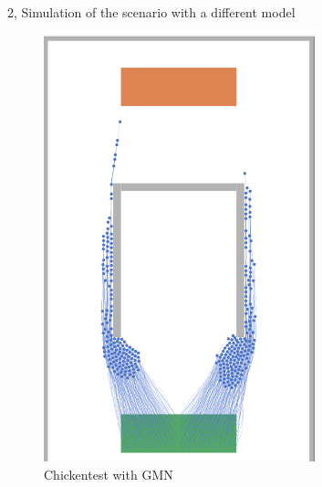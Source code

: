 \documentclass[10pt,a4paper]{article}
\begin{document}
\begin{task}{2, Simulation of the scenario with a different model}
\begin{itemize}
    \begin{figure}[H]
        \centering
        \includegraphics[width=0.7\textwidth]{pictures/gnm/chicken.png}
        \caption{Chickentest with GMN}
        \label{fig:chickentest_gnm}
    \end{figure}
\end{itemize}

\end{task}
\end{document}
